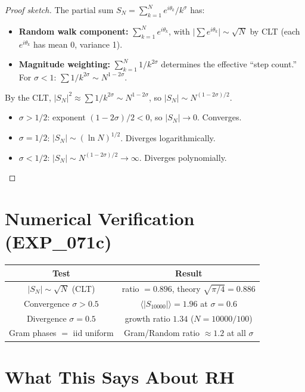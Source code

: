\documentclass[11pt]{article}
\begin{document}
\begin{proof}[Proof sketch]
The partial sum $S_N = \sum_{k=1}^{N} e^{i\theta_k}/k^\sigma$ has:
\begin{itemize}
  \item \textbf{Random walk component:}
    $\sum_{k=1}^{N} e^{i\theta_k}$, with
    $\bigl|\sum e^{i\theta_k}\bigr| \sim \sqrt{N}$ by CLT
    (each $e^{i\theta_k}$ has mean 0, variance 1).
  \item \textbf{Magnitude weighting:}
    $\sum_{k=1}^{N} 1/k^{2\sigma}$ determines the effective
    ``step count.''  For $\sigma < 1$:
    $\sum 1/k^{2\sigma} \sim N^{1-2\sigma}$.
\end{itemize}
By the CLT, $|S_N|^2 \approx \sum 1/k^{2\sigma} \sim N^{1-2\sigma}$, so
$|S_N| \sim N^{(1-2\sigma)/2}$.
\begin{itemize}
  \item $\sigma > 1/2$: exponent $(1-2\sigma)/2 < 0$, so $|S_N| \to 0$.
    Converges.
  \item $\sigma = 1/2$: $|S_N| \sim (\ln N)^{1/2}$.
    Diverges logarithmically.
  \item $\sigma < 1/2$: $|S_N| \sim N^{(1-2\sigma)/2} \to \infty$.
    Diverges polynomially.
\end{itemize}
\end{proof}

\section{Numerical Verification (EXP\_071c)}

\begin{center}
\renewcommand{\arraystretch}{1.2}
\begin{tabular}{cc}
\hline
\textbf{Test} & \textbf{Result} \\
\hline
$|S_N| \sim \sqrt{N}$ (CLT) &
  ratio $= 0.896$, theory $\sqrt{\pi/4} = 0.886$ \\
Convergence $\sigma > 0.5$ &
  $\langle|S_{10000}|\rangle = 1.96$ at $\sigma = 0.6$ \\
Divergence $\sigma = 0.5$ &
  growth ratio $1.34$ ($N = 10000/100$) \\
Gram phases $=$ iid uniform &
  Gram/Random ratio $\approx 1.2$ at all $\sigma$ \\
\hline
\end{tabular}
\end{center}

\section{What This Says About RH}
\end{document}
